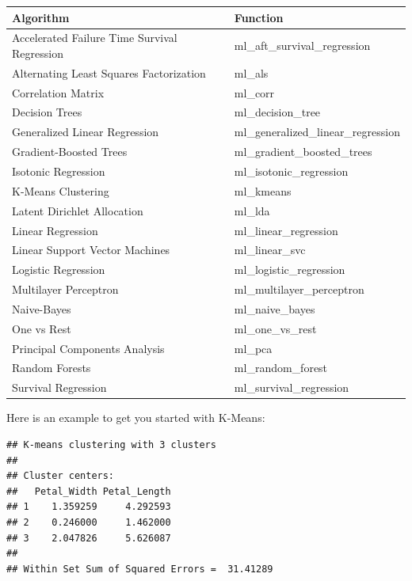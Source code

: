 \documentclass[]{book}
\newenvironment{Shaded}{\begin{snugshade}}{\end{snugshade}}
\newcommand{\CommentTok}[1]{\textcolor[rgb]{0.56,0.35,0.01}{\textit{#1}}}
\newcommand{\DataTypeTok}[1]{\textcolor[rgb]{0.13,0.29,0.53}{#1}}
\newcommand{\DecValTok}[1]{\textcolor[rgb]{0.00,0.00,0.81}{#1}}
\newcommand{\KeywordTok}[1]{\textcolor[rgb]{0.13,0.29,0.53}{\textbf{#1}}}
\newcommand{\NormalTok}[1]{#1}
\newcommand{\OperatorTok}[1]{\textcolor[rgb]{0.81,0.36,0.00}{\textbf{#1}}}
\newcommand{\OtherTok}[1]{\textcolor[rgb]{0.56,0.35,0.01}{#1}}
\newcommand{\StringTok}[1]{\textcolor[rgb]{0.31,0.60,0.02}{#1}}
\theoremstyle{definition}
\theoremstyle{definition}
\theoremstyle{definition}
\theoremstyle{remark}
\begin{document}
\begin{longtable}[]{@{}ll@{}}
\toprule
Algorithm & Function\tabularnewline
\midrule
\endhead
Accelerated Failure Time Survival Regression &
ml\_aft\_survival\_regression\tabularnewline
Alternating Least Squares Factorization & ml\_als\tabularnewline
Correlation Matrix & ml\_corr\tabularnewline
Decision Trees & ml\_decision\_tree\tabularnewline
Generalized Linear Regression &
ml\_generalized\_linear\_regression\tabularnewline
Gradient-Boosted Trees & ml\_gradient\_boosted\_trees\tabularnewline
Isotonic Regression & ml\_isotonic\_regression\tabularnewline
K-Means Clustering & ml\_kmeans\tabularnewline
Latent Dirichlet Allocation & ml\_lda\tabularnewline
Linear Regression & ml\_linear\_regression\tabularnewline
Linear Support Vector Machines & ml\_linear\_svc\tabularnewline
Logistic Regression & ml\_logistic\_regression\tabularnewline
Multilayer Perceptron & ml\_multilayer\_perceptron\tabularnewline
Naive-Bayes & ml\_naive\_bayes\tabularnewline
One vs Rest & ml\_one\_vs\_rest\tabularnewline
Principal Components Analysis & ml\_pca\tabularnewline
Random Forests & ml\_random\_forest\tabularnewline
Survival Regression & ml\_survival\_regression\tabularnewline
\bottomrule
\end{longtable}

Here is an example to get you started with K-Means:

\begin{Shaded}
\end{Shaded}

\begin{verbatim}
## K-means clustering with 3 clusters
## 
## Cluster centers:
##   Petal_Width Petal_Length
## 1    1.359259     4.292593
## 2    0.246000     1.462000
## 3    2.047826     5.626087
## 
## Within Set Sum of Squared Errors =  31.41289
\end{verbatim}
\end{document}

